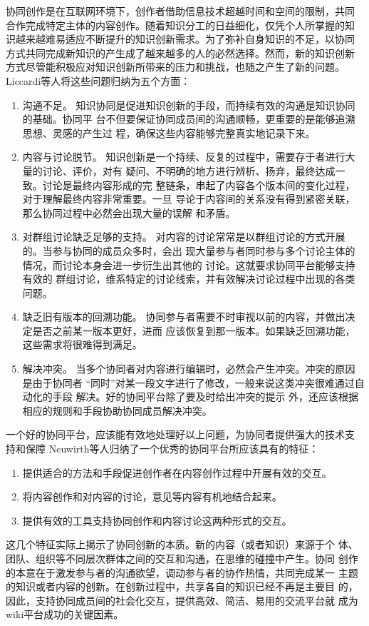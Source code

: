 协同创作是在互联网环境下，创作者借助信息技术超越时间和空间的限制，共同
合作完成特定主体的内容创作。随着知识分工的日益细化，仅凭个人所掌握的知
识越来越难易适应不断提升的知识创新需求。为了弥补自身知识的不足，以协同
方式共同完成新知识的产生成了越来越多的人的必然选择。然而，新的知识创新
方式尽管能积极应对知识创新所带来的压力和挑战，也随之产生了新的问题。
Liccardi等人将这些问题归纳为五个方面\cite{liccardi2007caws}：
\begin{enumerate}
\item 沟通不足。
知识协同是促进知识创新的手段，而持续有效的沟通是知识协同的基础。协同平
台不但要保证协同成员间的沟通顺畅，更重要的是能够追溯思想、灵感的产生过
程，确保这些内容能够完整真实地记录下来。
\item 内容与讨论脱节。
知识创新是一个持续、反复的过程中，需要存于者进行大量的讨论、评价，对有
疑问、不明确的地方进行辨析、扬弃，最终达成一致。讨论是最终内容形成的完
整链条，串起了内容各个版本间的变化过程，对于理解最终内容非常重要。一旦
导论于内容间的关系没有得到紧密关联，那么协同过程中必然会出现大量的误解
和矛盾。
\item 对群组讨论缺乏足够的支持。
对内容的讨论常常是以群组讨论的方式开展的。当参与协同的成员众多时，会出
现大量参与者同时参与多个讨论主体的情况，而讨论本身会进一步衍生出其他的
讨论。这就要求协同平台能够支持有效的
群组讨论，维系特定的讨论线索，并有效解决讨论过程中出现的各类问题。
\item 缺乏旧有版本的回溯功能。
协同参与者需要不时审视以前的内容，并做出决定是否之前某一版本更好，进而
应该恢复到那一版本。如果缺乏回溯功能，这些需求将很难得到满足。
\item 解决冲突。
 当多个协同者对内容进行编辑时，必然会产生冲突。冲突的原因是由于协同者
 “同时”对某一段文字进行了修改，一般来说这类冲突很难通过自动化的手段
 解决。好的协同平台除了要及时给出冲突的提示
 外，还应该根据相应的规则和手段协助协同成员解决冲突。
\end{enumerate}

一个好的协同平台，应该能有效地处理好以上问题，为协同者提供强大的技术支
持和保障
Neuwirth等人归纳了一个优秀的协同平台所应该具有的特征\cite{neuwirth1990issues}：
\begin{enumerate}
\item 提供适合的方法和手段促进创作者在内容创作过程中开展有效的交互。
\item 将内容创作和对内容的讨论，意见等内容有机地结合起来。
\item 提供有效的工具支持协同创作和内容讨论这两种形式的交互。
\end{enumerate}
这几个特征实际上揭示了协同创新的本质。新的内容（或者知识）来源于个
体、团队、组织等不同层次群体之间的交互和沟通，在思维的碰撞中产生。协同
创作的本意在于激发参与者的沟通欲望，调动参与者的协作热情，共同完成某一
主题的知识或者内容的创新。在创新过程中，共享各自的知识已经不再是主要目
的，因此，支持协同成员间的社会化交互，提供高效、简洁、易用的交流平台就
成为wiki平台成功的关键因素。


